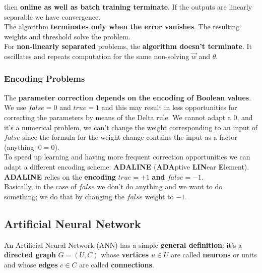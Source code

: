 \documentclass[11pt]{article}
\begin{document}
		then \textbf{online as well as batch training terminate}. If the outputs are linearly separable we have convergence.\\
		
		The algorithm \textbf{terminates only when the error vanishes}. The resulting weights and threshold solve the problem.\\
		
		For \textbf{non-linearly separated} problems, the \textbf{algorithm doesn't terminate}. It oscillates and repeats computation for the same non-solving $\vec{w}$ and $\theta$.\\
		
		\newpage
		
		\subsubsection{Encoding Problems}
		The \textbf{parameter correction depends on the encoding of Boolean values}. We use $false = 0$ and $true = 1$ and this may result in less opportunities for correcting the parameters by means of the Delta rule. We cannot adapt a 0, and it's a numerical problem, we can't change the weight corresponding to an input of $false$ since the formula for the weight change contains the input as a factor (anything $\cdot 0 = 0$).\\
		
		To speed up learning and having more frequent correction opportunities we can adapt a different encoding scheme: \textbf{ADALINE} (\textbf{ADA}ptive \textbf{LIN}ear \textbf{E}lement).\\
		
		\textbf{ADALINE} relies on the \textbf{encoding} $true = +1$ \textbf{and} $false = -1$.\\
		
		Basically, in the case of $false$ we don't do anything and we want to do something; we do that by changing the $false$ weight to $-1$.\\
		
		
		\newpage
		
		\subsection{Artificial Neural Network}
		An Artificial Neural Network (ANN) has a simple \textbf{general definition}: it's a \textbf{directed graph} $G= (U,C)$ whose \textbf{vertices} $u \in U$ are called \textbf{neurons} or units and whose \textbf{edges} $c \in C$ are called \textbf{connections}.\\
		
\end{document}
